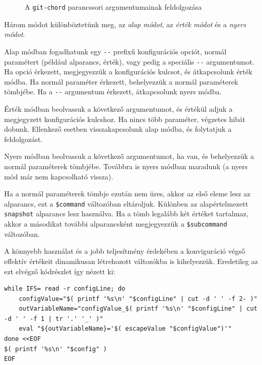 \documentclass[
]{elteikthesis}[2025/03/25]
\begin{document}
\begin{figure}[p]
\centering

\caption{A \texttt{git-chord} parancssori argumentumainak feldolgozása}
\label{fig:git-chord-args-flow}
\end{figure}

Három módot különböztetünk meg, az \textit{alap módot}, az \textit{érték módot} és a \textit{nyers módot}.

Alap módban fogadhatunk egy \verb|--| prefixű konfigurációs opciót, normál paramétert (például alparancs, érték), vagy pedig a speciális \verb|--| argumentumot.
Ha opció érkezett, megjegyezzük a konfigurációs kulcsot, és átkapcsolunk érték módba.
Ha normál paraméter érkezett, behelyezzük a normál paraméterek tömbjébe.
Ha a \verb|--| argumentum érkezett, átkapcsolunk nyers módba.

Érték módban beolvassuk a következő argumentumot, és értékül adjuk a megjegyzett konfigurációs kulcshoz.
Ha nincs több paraméter, végzetes hibát dobunk.
Ellenkező esetben visszakapcsolunk alap módba, és folytatjuk a feldolgozást.

Nyers módban beolvassuk a következő argumentumot, ha van,
és behelyezzük a normál paraméterek tömbjébe.
Továbbra is nyers módban maradunk
(a nyers mód már nem kapcsolható vissza).

Ha a normál paraméterek tömbje ezután nem üres, akkor az első eleme lesz az alparancs,
ezt a \verb|$command| változóban eltároljuk.
Különben az alapértelmezett \verb|snapshot| alparancs lesz használva.
Ha a tömb legalább két értéket tartalmaz, akkor a másodikat további alparancsként
megjegyezzük a \verb|$subcommand| változóban.

A könnyebb használat és a jobb teljesítmény érdekében a konviguráció végső effektív értékeit
dinamikusan létrehozott változókba is kihelyezzük.
Eredetileg az ezt elvégző kódrészlet így nézett ki:

\begin{listing}[H]
\begin{verbatim}
while IFS= read -r configLine; do
    configValue="$( printf '%s\n' "$configLine" | cut -d ' ' -f 2- )"
    outVariableName="configValue_$( printf '%s\n' "$configLine" | cut -d ' ' -f 1 | tr '.' '_' )"
    eval "${outVariableName}='$( escapeValue "$configValue")'"
done <<EOF
$( printf '%s\n' "$config" )
EOF
\end{verbatim}
\caption{Eredeti eval loop}
\end{listing}
\end{document}

